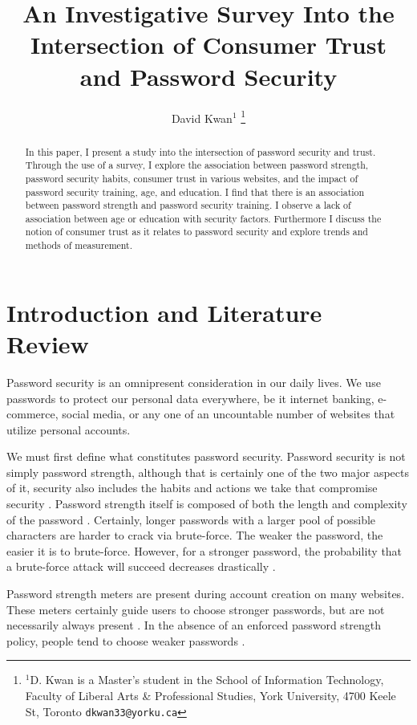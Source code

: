\documentclass[letterpaper, 10 pt, conference]{ieeeconf}  %
\title{\LARGE \bf
An Investigative Survey Into the Intersection of Consumer Trust and Password Security
}
\author{David Kwan$^{1}$%
\thanks{$^{1}$D. Kwan is a Master's student in the School of Information Technology, Faculty of Liberal Arts \& Professional Studies, York University, 4700 Keele St, Toronto
        {\tt\small dkwan33@yorku.ca}}%
}
\begin{document}
\maketitle
\thispagestyle{empty}
\pagestyle{empty}


\begin{abstract}

In this paper, I present a study into the intersection of password security and trust. Through the use of a survey, I explore the association between password strength, password security habits, consumer trust in various websites, and the impact of password security training, age, and education. I find that there is an association between password strength and password security training. I observe a lack of association between age or education with security factors. Furthermore I discuss the notion of consumer trust as it relates to password security and explore trends and methods of measurement.

\end{abstract}


\section{Introduction and Literature Review}

Password security is an omnipresent consideration in our daily lives. We use passwords to protect our personal data everywhere, be it internet banking, e-commerce, social media, or any one of an uncountable number of websites that utilize personal accounts. 

We must first define what constitutes password security. Password security is not simply password strength, although that is certainly one of the two major aspects of it, security also includes the habits and actions we take that compromise security \cite{Dhamija2000}. Password strength itself is composed of both the length and complexity of the password \cite{Morris1979}. Certainly, longer passwords with a larger pool of possible characters are harder to crack via brute-force. The weaker the password, the easier it is to brute-force. However, for a stronger password, the probability that a brute-force attack will succeed decreases drastically \cite{DellAmico2010}.

Password strength meters are present during account creation on many websites. These meters certainly guide users to choose stronger passwords, but are not necessarily always present \cite{DeCarnavalet2014}. In the absence of an enforced password strength policy, people tend to choose weaker passwords \cite{DellAmico2010}. 
\end{document}
